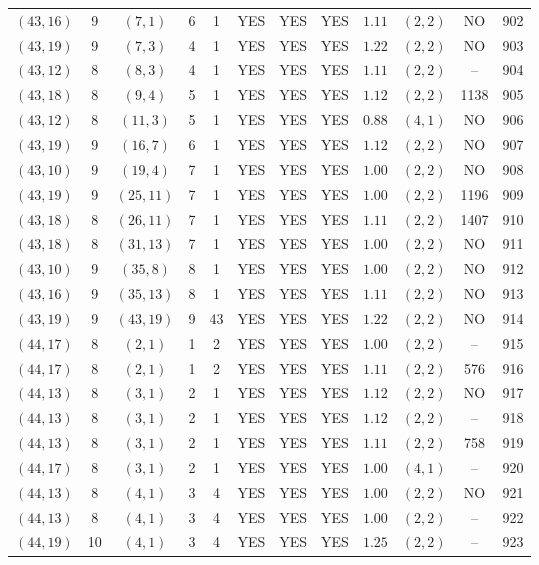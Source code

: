 \begin{longtable}{|c|c|c|c|c|c|c|c|c|c|c|c|}
$(43,16)$ & 9 & $(7,1)$ & 6 & 1 & YES & YES & YES & $1.11$ & $(2,2)$ & NO & 902\\
$(43,19)$ & 9 & $(7,3)$ & 4 & 1 & YES & YES & YES & $1.22$ & $(2,2)$ & NO & 903\\
$(43,12)$ & 8 & $(8,3)$ & 4 & 1 & YES & YES & YES & $1.11$ & $(2,2)$ & -- & 904\\
$(43,18)$ & 8 & $(9,4)$ & 5 & 1 & YES & YES & YES & $1.12$ & $(2,2)$ & 1138 & 905\\
$(43,12)$ & 8 & $(11,3)$ & 5 & 1 & YES & YES & YES & $0.88$ & $(4,1)$ & NO & 906\\
$(43,19)$ & 9 & $(16,7)$ & 6 & 1 & YES & YES & YES & $1.12$ & $(2,2)$ & NO & 907\\
$(43,10)$ & 9 & $(19,4)$ & 7 & 1 & YES & YES & YES & $1.00$ & $(2,2)$ & NO & 908\\
$(43,19)$ & 9 & $(25,11)$ & 7 & 1 & YES & YES & YES & $1.00$ & $(2,2)$ & 1196 & 909\\
$(43,18)$ & 8 & $(26,11)$ & 7 & 1 & YES & YES & YES & $1.11$ & $(2,2)$ & 1407 & 910\\
$(43,18)$ & 8 & $(31,13)$ & 7 & 1 & YES & YES & YES & $1.00$ & $(2,2)$ & NO & 911\\
$(43,10)$ & 9 & $(35,8)$ & 8 & 1 & YES & YES & YES & $1.00$ & $(2,2)$ & NO & 912\\
$(43,16)$ & 9 & $(35,13)$ & 8 & 1 & YES & YES & YES & $1.11$ & $(2,2)$ & NO & 913\\
$(43,19)$ & 9 & $(43,19)$ & 9 & 43 & YES & YES & YES & $1.22$ & $(2,2)$ & NO & 914\\
$(44,17)$ & 8 & $(2,1)$ & 1 & 2 & YES & YES & YES & $1.00$ & $(2,2)$ & -- & 915\\
$(44,17)$ & 8 & $(2,1)$ & 1 & 2 & YES & YES & YES & $1.11$ & $(2,2)$ & 576 & 916\\
$(44,13)$ & 8 & $(3,1)$ & 2 & 1 & YES & YES & YES & $1.12$ & $(2,2)$ & NO & 917\\
$(44,13)$ & 8 & $(3,1)$ & 2 & 1 & YES & YES & YES & $1.12$ & $(2,2)$ & -- & 918\\
$(44,13)$ & 8 & $(3,1)$ & 2 & 1 & YES & YES & YES & $1.11$ & $(2,2)$ & 758 & 919\\
$(44,17)$ & 8 & $(3,1)$ & 2 & 1 & YES & YES & YES & $1.00$ & $(4,1)$ & -- & 920\\
$(44,13)$ & 8 & $(4,1)$ & 3 & 4 & YES & YES & YES & $1.00$ & $(2,2)$ & NO & 921\\
$(44,13)$ & 8 & $(4,1)$ & 3 & 4 & YES & YES & YES & $1.00$ & $(2,2)$ & -- & 922\\
$(44,19)$ & 10 & $(4,1)$ & 3 & 4 & YES & YES & YES & $1.25$ & $(2,2)$ & -- & 923\\

\end{longtable}

